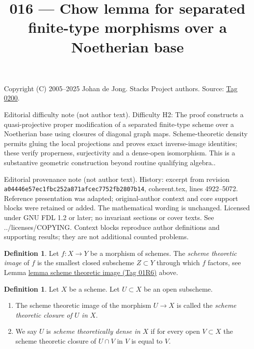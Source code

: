 \documentclass{amsart}
\theoremstyle{plain}
\theoremstyle{definition}
\newtheorem{definition}[subsection]{Definition}
\theoremstyle{remark}
\numberwithin{equation}{subsection}
\begin{document}
\title[Stacks Project, Tag 0200]{016 --- Chow lemma for separated finite-type morphisms over a Noetherian base}
\maketitle
\noindent Copyright (C) 2005--2025 Johan de Jong. Stacks Project authors. Source: \href{https://stacks.math.columbia.edu/tag/0200}{Tag 0200}.

\noindent Editorial difficulty note (not author text). Difficulty H2: The proof constructs a quasi-projective proper modification of a separated finite-type scheme over a Noetherian base using closures of diagonal graph maps. Scheme-theoretic density permits gluing the local projections and proves exact inverse-image identities; these verify properness, surjectivity and a dense-open isomorphism. This is a substantive geometric construction beyond routine qualifying algebra..

\noindent Editorial provenance note (not author text). History: excerpt from revision \texttt{a0444\allowbreak 6e57e\allowbreak c1fbc\allowbreak 252a8\allowbreak 71afc\allowbreak ec775\allowbreak 2fb28\allowbreak 07b14}, coherent.tex, lines 4922--5072. Reference presentation was adapted; original-author context and core support blocks were retained or added. The mathematical wording is unchanged. Licensed under GNU FDL 1.2 or later; no invariant sections or cover texts. See ../licenses/COPYING. Context blocks reproduce author definitions and supporting results; they are not additional counted problems.

\begin{definition}
\label{morphisms-definition-scheme-theoretic-image}
Let $f : X \to Y$ be a morphism of schemes. The {\it scheme theoretic image}
of $f$ is the smallest closed subscheme $Z \subset Y$ through which $f$
factors, see Lemma \href{https://stacks.math.columbia.edu/tag/01R6}{lemma scheme theoretic image (Tag 01R6)} above.
\end{definition}

\begin{definition}
\label{morphisms-definition-scheme-theoretically-dense}
Let $X$ be a scheme. Let $U \subset X$ be an open subscheme.
\begin{enumerate}
\item The scheme theoretic image of the morphism $U \to X$
is called the {\it scheme theoretic closure of $U$ in $X$}.
\item We say $U$ is {\it scheme theoretically dense in $X$}
if for every open $V \subset X$ the scheme theoretic closure
of $U \cap V$ in $V$ is equal to $V$.
\end{enumerate}
\end{definition}
\end{document}
